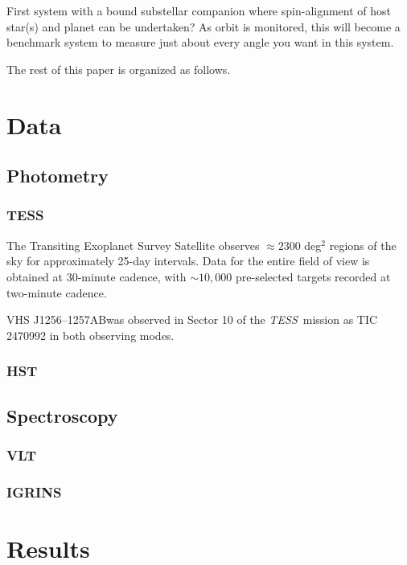 \documentclass[twocolumn]{aastex63}
\newcommand{\tess}{{\it TESS}}
\newcommand{\thissysshort}{{VHS J1256}}
\newcommand{\thisstar}{\thissystem AB}
\newcommand{\thissystem}{{\thissysshort –1257}}
\begin{document}
First system with a bound substellar companion where spin-alignment of host star(s) and planet can be undertaken? As orbit is monitored, this will become a benchmark system to measure just about every angle you want in this system.

The rest of this paper is organized as follows.


\section{Data}

\subsection{Photometry}

\subsubsection{TESS}

The Transiting Exoplanet Survey Satellite \citep[\tess][]{Ricker15} observes $\approx 2300$ deg$^2$ regions of the sky for approximately 25-day intervals. 
Data for the entire field of view is obtained at 30-minute cadence, with $\sim 10,000$ pre-selected targets recorded at two-minute cadence.

\thisstar was observed in Sector 10 of the \tess\ mission as TIC 2470992 in both observing modes.



\subsubsection{HST}


\subsection{Spectroscopy}

\subsubsection{VLT}

\subsubsection{IGRINS}


\section{Results}
\end{document}
